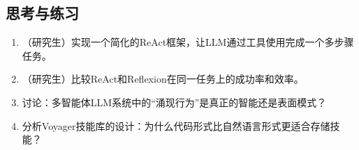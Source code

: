 \subsection*{思考与练习}
\begin{enumerate}
  \item （研究生）实现一个简化的ReAct框架，让LLM通过工具使用完成一个多步骤任务。
  \item （研究生）比较ReAct和Reflexion在同一任务上的成功率和效率。
  \item 讨论：多智能体LLM系统中的``涌现行为''是真正的智能还是表面模式？
  \item 分析Voyager技能库的设计：为什么代码形式比自然语言形式更适合存储技能？
\end{enumerate}
